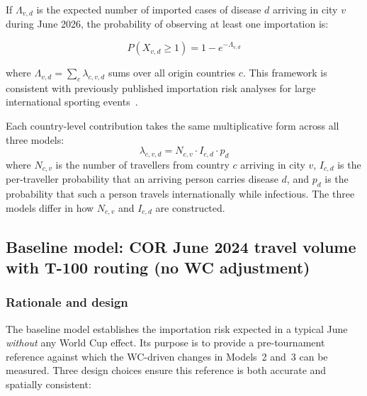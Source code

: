 \documentclass[12pt]{article}
\begin{document}
If $\Lambda_{v,d}$ is the expected number of imported cases of disease
$d$ arriving in city $v$ during June 2026, the probability of
observing at least one importation is:

\begin{equation}
  P(X_{v,d} \geq 1) = 1 - e^{-\Lambda_{v,d}}
  \label{eq:poisson}
\end{equation}

where $\Lambda_{v,d} = \sum_{c} \lambda_{c,v,d}$ sums over all origin
countries $c$. This framework is consistent with previously
published importation risk analyses for large international sporting
events~\cite{Herrera2024}.

Each country-level contribution takes the same multiplicative form
across all three models:
\begin{equation}
  \lambda_{c,v,d} = N_{c,v} \cdot I_{c,d} \cdot p_d
  \label{eq:general_lambda}
\end{equation}
where $N_{c,v}$ is the number of travellers from country $c$ arriving
in city $v$, $I_{c,d}$ is the per-traveller probability that an
arriving person carries disease $d$, and $p_d$ is the probability
that such a person travels internationally while infectious. The three
models differ in how $N_{c,v}$ and $I_{c,d}$ are constructed.

\subsection*{Baseline model: COR June 2024 travel volume with T-100 routing
(no WC adjustment)}

\subsubsection*{Rationale and design}

The baseline model establishes the importation risk expected in a
typical June \emph{without} any World Cup effect. Its purpose is to
provide a pre-tournament reference against which the WC-driven
changes in Models~2 and~3 can be measured. Three design choices
ensure this reference is both accurate and spatially consistent:
\end{document}
